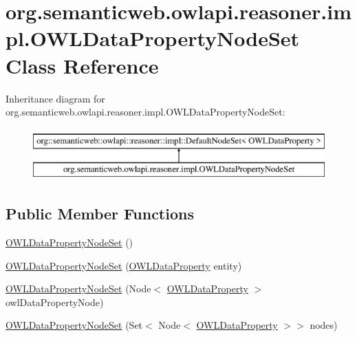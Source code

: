 \hypertarget{classorg_1_1semanticweb_1_1owlapi_1_1reasoner_1_1impl_1_1_o_w_l_data_property_node_set}{\section{org.\-semanticweb.\-owlapi.\-reasoner.\-impl.\-O\-W\-L\-Data\-Property\-Node\-Set Class Reference}
\label{classorg_1_1semanticweb_1_1owlapi_1_1reasoner_1_1impl_1_1_o_w_l_data_property_node_set}
}
Inheritance diagram for org.\-semanticweb.\-owlapi.\-reasoner.\-impl.\-O\-W\-L\-Data\-Property\-Node\-Set\-:\begin{figure}[H]
\begin{center}
\leavevmode
\includegraphics[height=2.000000cm]{classorg_1_1semanticweb_1_1owlapi_1_1reasoner_1_1impl_1_1_o_w_l_data_property_node_set}
\end{center}
\end{figure}
\subsection*{Public Member Functions}
\begin{DoxyCompactItemize}
\item 
\hyperlink{classorg_1_1semanticweb_1_1owlapi_1_1reasoner_1_1impl_1_1_o_w_l_data_property_node_set_a119b2b059c9c2a8c30c119f4e3f6a7e8}{O\-W\-L\-Data\-Property\-Node\-Set} ()
\item 
\hyperlink{classorg_1_1semanticweb_1_1owlapi_1_1reasoner_1_1impl_1_1_o_w_l_data_property_node_set_a1f9732c2c0c923f1bb74060ff8349d25}{O\-W\-L\-Data\-Property\-Node\-Set} (\hyperlink{interfaceorg_1_1semanticweb_1_1owlapi_1_1model_1_1_o_w_l_data_property}{O\-W\-L\-Data\-Property} entity)
\item 
\hyperlink{classorg_1_1semanticweb_1_1owlapi_1_1reasoner_1_1impl_1_1_o_w_l_data_property_node_set_a3f4f98e1000adeee554bc4f184708768}{O\-W\-L\-Data\-Property\-Node\-Set} (Node$<$ \hyperlink{interfaceorg_1_1semanticweb_1_1owlapi_1_1model_1_1_o_w_l_data_property}{O\-W\-L\-Data\-Property} $>$ owl\-Data\-Property\-Node)
\item 
\hyperlink{classorg_1_1semanticweb_1_1owlapi_1_1reasoner_1_1impl_1_1_o_w_l_data_property_node_set_a1e653e2ae22490d0cb5cfa0c9a062574}{O\-W\-L\-Data\-Property\-Node\-Set} (Set$<$ Node$<$ \hyperlink{interfaceorg_1_1semanticweb_1_1owlapi_1_1model_1_1_o_w_l_data_property}{O\-W\-L\-Data\-Property} $>$$>$ nodes)
\end{DoxyCompactItemize}
